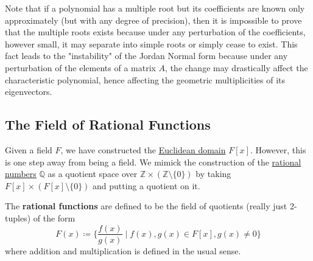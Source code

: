   Note that if a polynomial has a multiple root but its coefficients are known only approximately (but with any degree of precision), then it is impossible to prove that the multiple roots exists because under any perturbation of the coefficients, however small, it may separate into simple roots or simply cease to exist. This fact leads to the "instability" of the Jordan Normal form because under any perturbation of the elements of a matrix $A$, the change may drastically affect the characteristic polynomial, hence affecting the geometric multiplicities of its eigenvectors. 

\subsection{The Field of Rational Functions}

  Given a field $F$, we have constructed the \hyperref[def:euclidean-domain]{Euclidean domain} $F[x]$. However, this is one step away from being a field. We mimick the construction of the \hyperref[def:rational-numbers]{rational numbers} $\mathbb{Q}$ as a quotient space over $\mathbb{Z} \times (\mathbb{Z} \setminus \{0\})$ by taking $F[x] \times (F[x] \setminus \{0\})$ and putting a quotient on it. 
  
  \begin{definition}
    \label{def:rational-functions}
    The \textbf{rational functions} are defined to be the field of quotients (really just 2-tuples) of the form 
    \begin{equation}
      F(x) \coloneqq \bigg\{ \frac{f(x)}{g(x)} \; \bigg| \; f(x), g(x) \in F[x], g(x) \neq 0 \bigg\}
    \end{equation}
    where addition and multiplication is defined in the usual sense.
  \end{definition}

